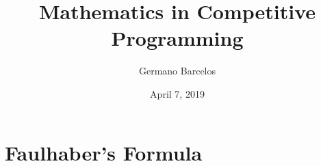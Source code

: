 \documentclass[12pt, 14paper]{article}
\title{Mathematics in Competitive Programming}
\date{April 7, 2019}
\author{Germano Barcelos}
\begin{document}
  \maketitle
  \section*{Faulhaber's Formula}
  
\end{document}

